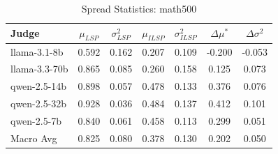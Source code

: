 \begin{table}[h]
\centering
\caption{Spread Statistics: math500}
\label{tab:spread_math500}
\begin{tabular}{l c c c c c c}
\hline
Judge & $\mu_{LSP}$ & $\sigma^2_{LSP}$ & $\mu_{ILSP}$ & $\sigma^2_{ILSP}$ & $\Delta\mu^*$ & $\Delta\sigma^2$ \\
\hline
llama-3.1-8b & 0.592 & 0.162 & 0.207 & 0.109 & -0.200 & -0.053 \\
llama-3.3-70b & 0.865 & 0.085 & 0.260 & 0.158 & 0.125 & 0.073 \\
qwen-2.5-14b & 0.898 & 0.057 & 0.478 & 0.133 & 0.376 & 0.076 \\
qwen-2.5-32b & 0.928 & 0.036 & 0.484 & 0.137 & 0.412 & 0.101 \\
qwen-2.5-7b & 0.840 & 0.061 & 0.458 & 0.113 & 0.299 & 0.051 \\
\hline
Macro Avg & 0.825 & 0.080 & 0.378 & 0.130 & 0.202 & 0.050 \\
\hline
\end{tabular}
\end{table}